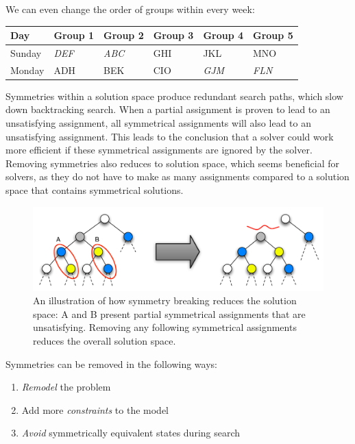 \documentclass[a4paper]{scrartcl}
\begin{document}
We can even change the order of groups within every week:

\begin{table}[h]
\centering
\begin{tabular}{ l | l  l  l l  l }
Day & Group 1 & Group 2 & Group 3 & Group 4 & Group 5 \\
\hline
Sunday & \emph{DEF} & \emph{ABC} & GHI & JKL & MNO \\
Monday & ADH  & BEK & CIO & \emph{GJM} & \emph{FLN}\\
\end{tabular}
\end{table}

Symmetries within a solution space produce redundant search paths, which slow down backtracking search. When a partial assignment is proven to lead to an unsatisfying assignment, all symmetrical assignments will also lead to an unsatisfying assignment. This leads to the conclusion that a solver could work more efficient if these symmetrical assignments are ignored by the solver. Removing symmetries also reduces to solution space, which seems beneficial for solvers, as they do not have to make as many assignments compared to a solution space that contains symmetrical solutions.

\begin{figure}[h!]
\centering
    \includegraphics[width=13.6cm]{images/symmetry_breaking}
    \caption{An illustration of how symmetry breaking reduces the solution space: A and B present partial symmetrical assignments that are unsatisfying. Removing any following symmetrical assignments reduces the overall solution space.}
\end{figure}

\pagebreak

Symmetries can be removed in the following ways:

\begin{enumerate}
\item \emph{Remodel} the problem
\item Add more \emph{constraints} to the model
\item \emph{Avoid} symmetrically equivalent states during search
\end{enumerate}
\end{document}
